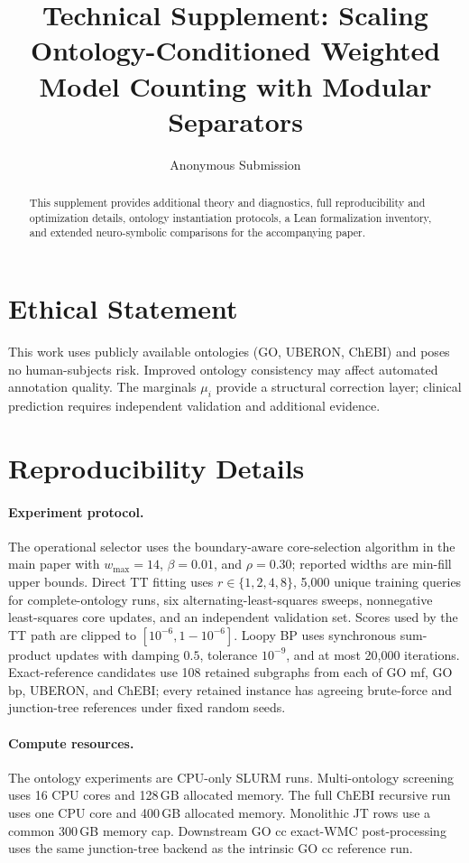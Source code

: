 \documentclass[letterpaper]{article}
\title{Technical Supplement: Scaling Ontology-Conditioned Weighted Model Counting with Modular Separators}
\author{
    Anonymous Submission
}
\begin{document}
\maketitle

\begin{abstract}
This supplement provides additional theory and diagnostics, full
reproducibility and optimization details, ontology instantiation protocols,
a Lean formalization inventory, and extended neuro-symbolic comparisons for
the accompanying paper.
\end{abstract}

\appendix
\section{Ethical Statement}
This work uses publicly available ontologies (GO, UBERON, ChEBI) and poses no human-subjects risk. Improved ontology consistency may affect automated annotation quality. The marginals $\mu_i$ provide a structural correction layer; clinical prediction requires independent validation and additional evidence.

\section{Reproducibility Details}
\label{app:reproducibility}

\paragraph{Experiment protocol.}
The operational selector uses the boundary-aware core-selection algorithm in the main paper with
\(w_{\max}=14\), \(\beta=0.01\), and \(\rho=0.30\); reported widths are
min-fill upper bounds. Direct TT fitting uses
\(r\in\{1,2,4,8\}\), 5,000 unique training queries for complete-ontology
runs, six alternating-least-squares sweeps, nonnegative least-squares core
updates, and an independent validation set. Scores used by the TT path are
clipped to \([10^{-6},1-10^{-6}]\). Loopy BP uses synchronous sum-product
updates with damping \(0.5\), tolerance \(10^{-9}\), and at most 20,000
iterations. Exact-reference candidates use 108 retained subgraphs from
each of GO mf, GO bp, UBERON, and ChEBI; every retained instance has
agreeing brute-force and junction-tree references under fixed random seeds.

\paragraph{Compute resources.}
The ontology experiments are CPU-only SLURM runs. Multi-ontology screening
uses 16 CPU cores and 128\,GB allocated memory. The full ChEBI recursive
run uses one CPU core and 400\,GB allocated memory. Monolithic JT rows use
a common 300\,GB memory cap. Downstream GO cc exact-WMC post-processing uses
the same junction-tree backend as the intrinsic GO cc reference run.
\end{document}
